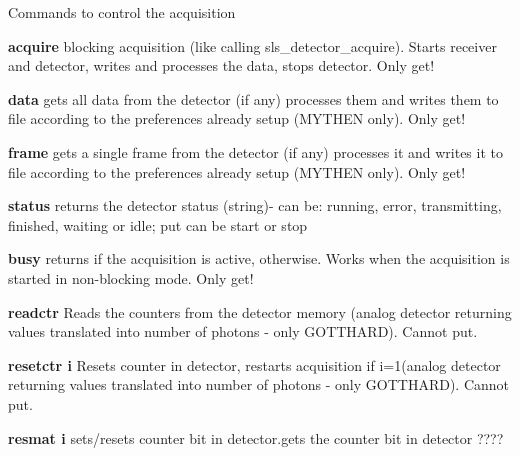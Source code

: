 Commands to control the acquisition


\begin{DoxyItemize}
\item {\bfseries acquire} blocking acquisition (like calling sls\_\-detector\_\-acquire). Starts receiver and detector, writes and processes the data, stops detector. Only get!
\end{DoxyItemize}


\begin{DoxyItemize}
\item {\bfseries data} gets all data from the detector (if any) processes them and writes them to file according to the preferences already setup (MYTHEN only). Only get!
\end{DoxyItemize}


\begin{DoxyItemize}
\item {\bfseries frame} gets a single frame from the detector (if any) processes it and writes it to file according to the preferences already setup (MYTHEN only). Only get!
\end{DoxyItemize}


\begin{DoxyItemize}
\item {\bfseries status} {\ttfamily returns} the detector status (string)-\/ can be: {\ttfamily running}, {\ttfamily error}, {\ttfamily transmitting}, {\ttfamily finished}, {\ttfamily waiting} or {\ttfamily idle}; {\ttfamily put} can be {\ttfamily start} or {\ttfamily stop} 
\end{DoxyItemize}


\begin{DoxyItemize}
\item {\bfseries busy} returns {} if the acquisition is active, {} otherwise. Works when the acquisition is started in non-\/blocking mode. Only get!
\end{DoxyItemize}


\begin{DoxyItemize}
\item {\bfseries readctr } Reads the counters from the detector memory (analog detector returning values translated into number of photons -\/ only GOTTHARD). Cannot put.
\end{DoxyItemize}


\begin{DoxyItemize}
\item {\bfseries resetctr i } Resets counter in detector, restarts acquisition if i=1(analog detector returning values translated into number of photons -\/ only GOTTHARD). Cannot put.
\end{DoxyItemize}


\begin{DoxyItemize}
\item {\bfseries resmat i } sets/resets counter bit in detector.gets the counter bit in detector ???? 
\end{DoxyItemize}
